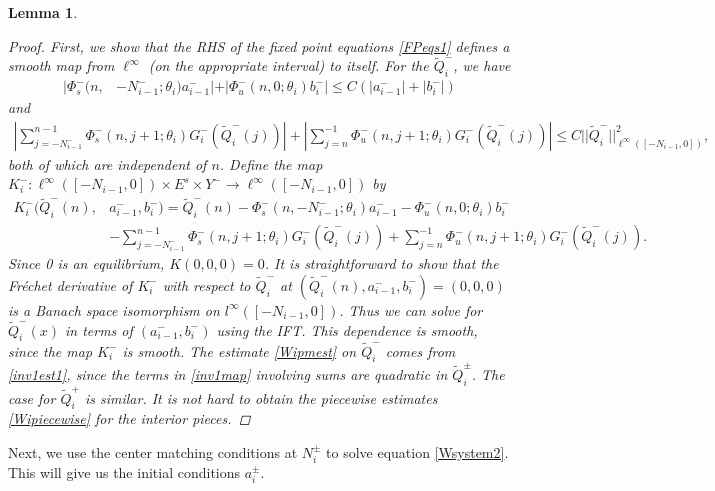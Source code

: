 \documentclass[12pt]{elsarticle}
\newtheorem{lemma}{Lemma}
\begin{document}
\begin{lemma}
\begin{proof}
First, we show that the RHS of the fixed point equations \cref{FPeqs1} defines a smooth map from $\ell^\infty$ (on the appropriate interval) to itself. For the $\tilde{Q}_i^-$, we have
\begin{align}\label{inv1est1}
|\Phi_s^-(n, &-N_{i-1}^-; \theta_i) a_{i-1}^-| + |\Phi_u^-(n, 0; \theta_i) b_i^-| \leq C ( |a_{i-1}^-| + |b_i^-|) 
\end{align}
and
\begin{align*}
\left| \sum_{j = -N_{i-1}^-}^{n-1} \Phi_s^-(n, j+1; \theta_i) G_i^-(\tilde{Q}_i^-(j))\right| + \left|\sum_{j = n}^{-1} \Phi_u^-(n, j+1; \theta_i) G_i^-(\tilde{Q}_i^-(j))\right| 
\leq C ||\tilde{Q}_i^-||_{\ell^\infty([-N_{i-1}, 0])}^2 ,
\end{align*}
both of which are independent of $n$. Define the map
$K_i^-: \ell^\infty([-N_{i-1}, 0]) \times E^s \times Y^- \rightarrow \ell^\infty([-N_{i-1}, 0])$ by
\begin{align}\label{inv1map}
K_i^-(\tilde{Q}_i^-(n), &a_{i-1}^-, b_i^-) = \tilde{Q}_i^-(n) - \Phi_s^-(n, -N_{i-1}^-; \theta_i) a_{i-1}^- - \Phi_u^-(n, 0; \theta_i) b_i^-  \\
&- \sum_{j = -N_{i-1}^-}^{n-1} \Phi_s^-(n, j+1; \theta_i) G_i^-(\tilde{Q}_i^-(j)) + \sum_{j = n}^{-1} \Phi_u^-(n, j+1; \theta_i) G_i^-(\tilde{Q}_i^-(j)) . \nonumber
\end{align}
Since 0 is an equilibrium, $K(0, 0, 0) = 0$. It is straightforward to show that the Fr\'echet derivative of $K_i^-$ with respect to $\tilde{Q}_i^-$ at $(\tilde{Q}_i^-(n), a_{i-1}^-, b_i^-) = (0, 0, 0)$ is a Banach space isomorphism on $l^\infty([-N_{i-1}, 0])$. Thus we can solve for $\tilde{Q}_i^-(x)$ in terms of $(a_{i-1}^-, b_i^-)$ using the IFT. This dependence is smooth, since the map $K_i^-$ is smooth. The estimate \cref{Wipmest} on $\tilde{Q}_i^-$ comes from \cref{inv1est1}, since the terms in \cref{inv1map} involving sums are quadratic in $\tilde{Q}_i^\pm$. The case for $\tilde{Q}_i^+$ is similar. It is not hard to obtain the piecewise estimates \cref{Wipiecewise} for the interior pieces.
\end{proof}
\end{lemma}

Next, we use the center matching conditions at $N_i^\pm$ to solve equation \cref{Wsystem2}. This will give us the initial conditions $a_i^\pm$.
\end{document}
